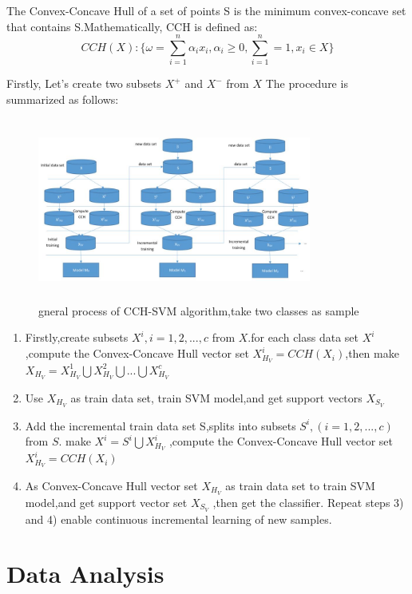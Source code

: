 \documentclass[a4paper]{article}
\begin{document}
The Convex-Concave Hull of a set of points S is the minimum convex-concave set that contains S.Mathematically, CCH is defined as:
$$
CCH(X) :\{ \omega = \sum_{i=1} ^{n} \alpha_i x_i, \alpha_i \geq 0, \sum_{i=1} ^{n} = 1, x_i \in X \}
$$

Firstly, Let's create two subsets $X^+$ and $X^-$ from $X$
The procedure is summarized as follows:
\begin{figure}[h]
  \centering
  \includegraphics[width=9cm,height=6cm]{CCH-SVM}
  \caption{gneral process of CCH-SVM algorithm,take two classes as sample}
\end{figure}

\begin{enumerate}
\item Firstly,create subsets $X^i, i= 1,2,...,c$ from $X$.for each class data set $X^{i}$ ,compute the Convex-Concave Hull vector set $X ^{i}_{H_{V}} = CCH(X_i)$,then make  $ X_{H_{V}} =X ^{1}_{H_{V}}  \bigcup X ^{2}_{H_{V}} \bigcup ...\bigcup X ^{c}_{H_{V}} $

\item Use $X_{H_{V}}$ as train data set, train SVM model,and get support vectors $X_{S_{V}}$

\item Add the incremental train data set S,splits into subsets $S^i ,( i= 1,2,...,c)$ from $S$.
make $X^i = S^i \bigcup X^i _{H_{V}}$ ,compute the Convex-Concave Hull vector set $X ^{i}_{H_{V}} = CCH(X_i)$

\item As Convex-Concave Hull vector set $X_{H_{V}}$ as train data set to train SVM model,and get support vector set $X_{S_{V}}$ ,then get the classifier.
Repeat steps 3) and 4) enable continuous incremental learning of new samples.
\end{enumerate}



\section{Data Analysis}
\end{document}
